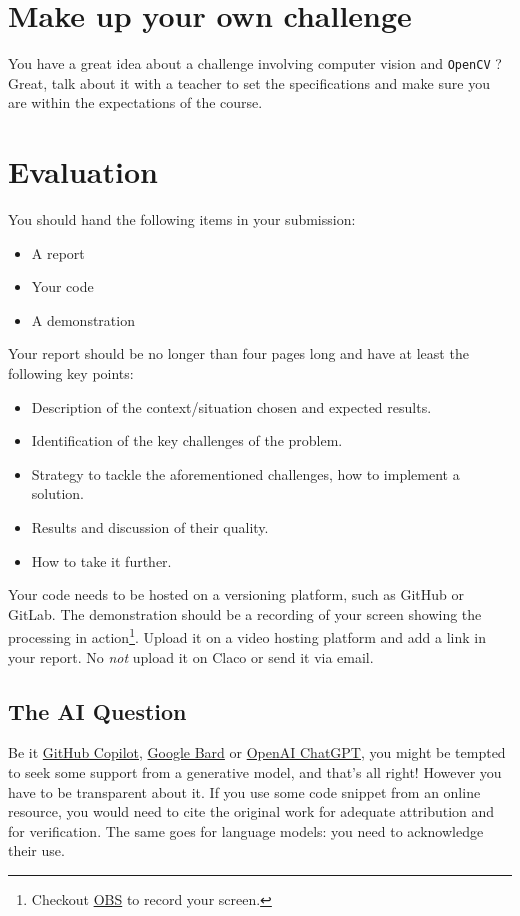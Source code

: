 \documentclass{labo}
\newcommand{\opencv}{\texttt{OpenCV} }
\begin{document}
\section*{Make up your own challenge}
You have a great idea about a challenge involving computer vision and \opencv? Great, talk about it with a teacher to set the specifications and make sure you are within the expectations of the course.


\section*{Evaluation}
You should hand the following items in your submission:
\begin{itemize}
	\item A report
	\item Your code
	\item A demonstration
\end{itemize}

Your report should be no longer than four pages long and have at least the following key points:
\begin{itemize}
	\item Description of the context/situation chosen and expected results.
	\item Identification of the key challenges of the problem.
	\item Strategy to tackle the aforementioned challenges, how to implement a solution.
	\item Results and discussion of their quality.
	\item How to take it further.
\end{itemize}

Your code needs to be hosted on a versioning platform, such as GitHub or GitLab.
The demonstration should be a recording of your screen showing the processing in action\footnote{Checkout \href{https://obsproject.com/}{OBS} to record your screen.}. Upload it on a video hosting platform and add a link in your report. No \textit{not} upload it on Claco or send it via email.

\subsection*{The AI Question}
Be it \href{https://github.com/features/copilot}{GitHub Copilot}, \href{https://bard.google.com/}{Google Bard} or \href{https://chat.openai.com}{OpenAI ChatGPT}, you might be tempted to seek some support from a generative model, and that's all right!
However you have to be transparent about it.
If you use some code snippet from an online resource, you would need to cite the original work for adequate attribution and for verification. The same goes for language models: you need to acknowledge their use.
\end{document}
